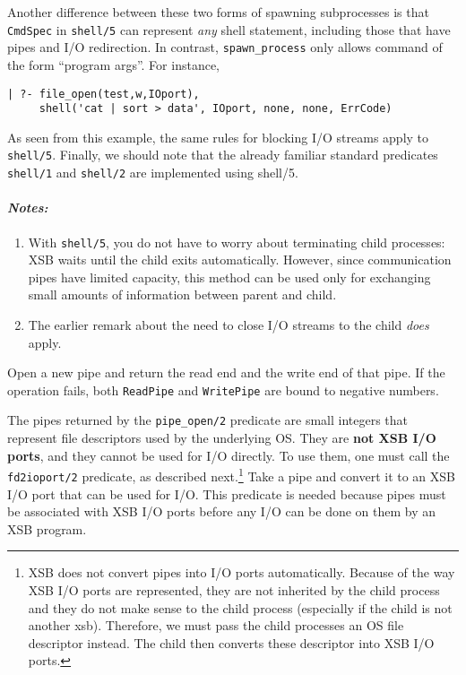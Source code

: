 \begin{description}
  Another difference between these two forms of spawning subprocesses is
  that {\tt CmdSpec} in {\tt shell/5} can represent \emph{any} shell
  statement, including those that have pipes and I/O redirection. In
  contrast, \verb|spawn_process| only allows command of the form ``program
  args''. For instance,
\begin{verbatim}
| ?- file_open(test,w,IOport),
     shell('cat | sort > data', IOport, none, none, ErrCode)
\end{verbatim}
As seen from this example, the same rules for blocking I/O streams
apply to {\tt shell/5}. Finally, we should note that the already familiar
standard predicates {\tt shell/1} and {\tt shell/2} are implemented using
shell/5.

\paragraph{\em Notes:}
\begin{enumerate}
  \item  With {\tt shell/5}, you do not have to worry about terminating
    child processes: XSB waits until the child exits automatically.
    However, since communication pipes have limited capacity, this method
    can be used only for exchanging small amounts of information between
    parent and child.
  \item The earlier remark about the need to close I/O streams to the child
    \emph{does} apply.
\end{enumerate}

  Open a new pipe and return the read end and the write end of that pipe.
  If the operation fails, both {\tt ReadPipe} and {\tt WritePipe} are bound
  to negative numbers.
  
  The pipes returned by the {\tt pipe\_open/2} predicate are small integers
  that represent file descriptors used by the underlying OS. They are {\bf
    not XSB I/O ports}, and they cannot be used for I/O directly. To
  use them, one must call the {\tt fd2ioport/2} predicate, as described
  next.\footnote{
    XSB does not convert pipes into I/O ports automatically.
    Because of the way XSB I/O ports are represented, they are not
    inherited by the child process and they do not make sense to the child
    process (especially if the child is not another xsb). Therefore, we
    must pass the child processes an OS file descriptor instead. The child then
    converts these descriptor into XSB I/O ports.
    }
    Take a pipe and convert it to an XSB I/O port that can be used
    for I/O. This predicate is needed because pipes must be associated with
    XSB I/O ports before any I/O can be done on them by an XSB program.


\end{description}
